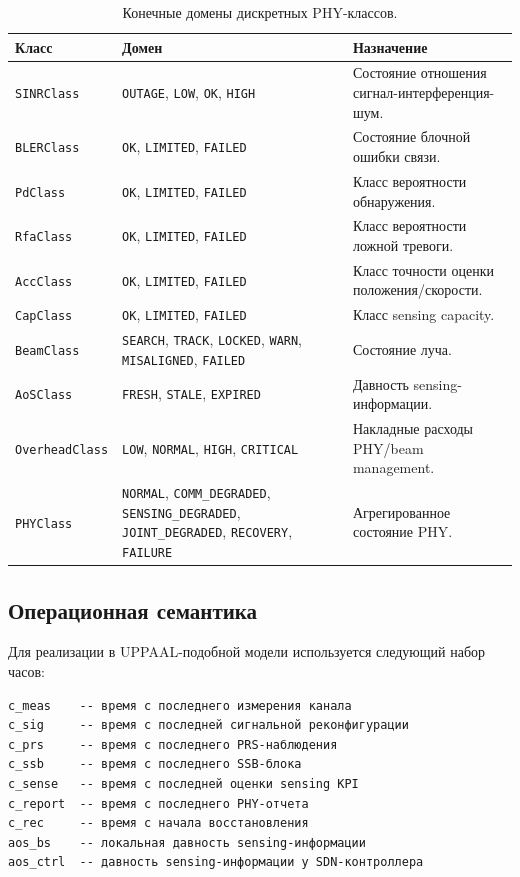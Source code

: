 \documentclass[12pt,a4paper]{article}
\begin{document}
\begin{table}[htbp]
\centering
\small
\setlength{\tabcolsep}{4pt}
\begin{tabularx}{\textwidth}{p{}p{}Y}
\toprule
Класс & Домен & Назначение \\
\midrule
\texttt{SINRClass} & \texttt{OUTAGE}, \texttt{LOW}, \texttt{OK}, \texttt{HIGH} & Состояние отношения сигнал-интерференция-шум. \\
\texttt{BLERClass} & \texttt{OK}, \texttt{LIMITED}, \texttt{FAILED} & Состояние блочной ошибки связи. \\
\texttt{PdClass} & \texttt{OK}, \texttt{LIMITED}, \texttt{FAILED} & Класс вероятности обнаружения. \\
\texttt{RfaClass} & \texttt{OK}, \texttt{LIMITED}, \texttt{FAILED} & Класс вероятности ложной тревоги. \\
\texttt{AccClass} & \texttt{OK}, \texttt{LIMITED}, \texttt{FAILED} & Класс точности оценки положения/скорости. \\
\texttt{CapClass} & \texttt{OK}, \texttt{LIMITED}, \texttt{FAILED} & Класс sensing capacity. \\
\texttt{BeamClass} & \texttt{SEARCH}, \texttt{TRACK}, \texttt{LOCKED}, \texttt{WARN}, \texttt{MISALIGNED}, \texttt{FAILED} & Состояние луча. \\
\texttt{AoSClass} & \texttt{FRESH}, \texttt{STALE}, \texttt{EXPIRED} & Давность sensing-информации. \\
\texttt{OverheadClass} & \texttt{LOW}, \texttt{NORMAL}, \texttt{HIGH}, \texttt{CRITICAL} & Накладные расходы PHY/beam management. \\
\texttt{PHYClass} & \texttt{NORMAL}, \texttt{COMM\_DEGRADED}, \texttt{SENSING\_DEGRADED}, \texttt{JOINT\_DEGRADED}, \texttt{RECOVERY}, \texttt{FAILURE} & Агрегированное состояние PHY. \\
\bottomrule
\end{tabularx}
\caption{Конечные домены дискретных PHY-классов.}
\label{tab:finite_domains}
\end{table}

\subsection{Операционная семантика}

Для реализации в UPPAAL-подобной модели используется следующий набор часов:

\begin{verbatim}
c_meas    -- время с последнего измерения канала
c_sig     -- время с последней сигнальной реконфигурации
c_prs     -- время с последнего PRS-наблюдения
c_ssb     -- время с последнего SSB-блока
c_sense   -- время с последней оценки sensing KPI
c_report  -- время с последнего PHY-отчета
c_rec     -- время с начала восстановления
aos_bs    -- локальная давность sensing-информации
aos_ctrl  -- давность sensing-информации у SDN-контроллера
\end{verbatim}
\end{document}

